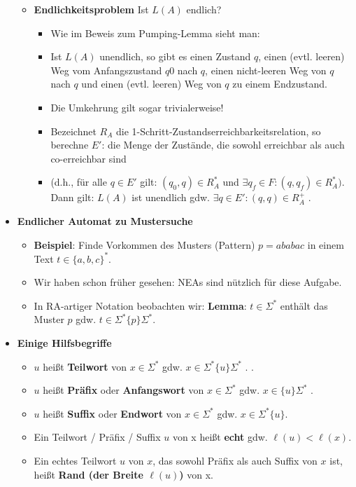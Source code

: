 \documentclass[12pt, a4paper]{article}
\begin{document}
\begin{itemize}
\begin{itemize}
			\item \textbf{Endlichkeitsproblem} Ist $L(A)$ endlich? 
			\begin{itemize}
				\item Wie im Beweis zum Pumping-Lemma sieht man:
				\item Ist $L(A)$ unendlich, so gibt es einen Zustand $q$, einen (evtl. leeren) Weg vom
				Anfangszustand $q 0$ nach $q$, einen nicht-leeren Weg von $q$ nach $q$ und einen
				(evtl. leeren) Weg von $q$ zu einem Endzustand.
				\item Die Umkehrung gilt sogar trivialerweise!
				\item Bezeichnet $R_{A}$ die 1-Schritt-Zustandserreichbarkeitsrelation, so berechne $E'$: die Menge der Zustände, die sowohl erreichbar als auch co-erreichbar sind
				\item (d.h., für alle $q\in E'$ gilt: $(q_{0},q)\in R^{*}_{A}$ und $\exists q_{f}\in F:(q,q_{f})\in R^{*}_{A})$.
				Dann gilt: $L(A)$ ist unendlich gdw. $\exists q \in E':(q,q)\in R^{+}_{A}$ .
			\end{itemize}
		\end{itemize}
		
		\item \textbf{Endlicher Automat zu Mustersuche}
		\begin{itemize}
			\item \textbf{Beispiel}: Finde Vorkommen des Musters (Pattern)
			$p = ababac$
			in einem Text $t\in\{a, b, c\}^{*}$.
			
			\item Wir haben schon früher gesehen:
			\subitem NEAs sind nützlich für diese Aufgabe.
			
			\item In RA-artiger Notation beobachten wir:
			\subitem \textbf{Lemma}: $t\in\Sigma^{*}$ enthält das Muster $p$ gdw. $t\in\Sigma^{*}\{p\}\Sigma^{*}$.
		\end{itemize}
	
		\item \textbf{Einige Hilfsbegriffe}
		\begin{itemize}
			\item $u$ heißt \textbf{Teilwort} von $x\in\Sigma^{*}$ gdw. $x\in\Sigma^{*}\{u\}\Sigma^{*}$ .
				.
			\item $u$ heißt \textbf{Präfix} oder \textbf{Anfangswort} von $x\in\Sigma^{*}$ gdw. $x\in\{u\}\Sigma^{*}$ .
			\item $u$ heißt \textbf{Suffix} oder \textbf{Endwort} von $x\in\Sigma^{*}$ gdw. $x\in\Sigma^{*}\{u\}$.
			\item Ein Teilwort / Präfix / Suffix $u$ von x heißt \textbf{echt} gdw. $\ell(u) < \ell(x)$.
			\item Ein echtes Teilwort $u$ von $x$, das sowohl Präfix als auch Suffix von $x$ ist, heißt \textbf{Rand (der Breite $\ell(u)$)} von x.
		\end{itemize}
	

\end{itemize}
\end{document}
